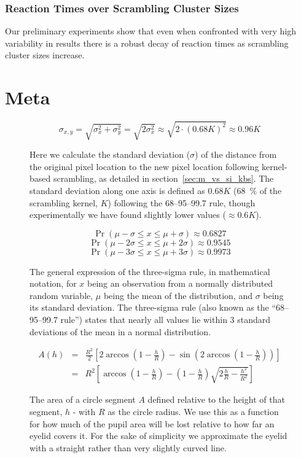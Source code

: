 	\subsection{Reaction Times over Scrambling Cluster Sizes}
	    Our preliminary experiments show that even when confronted with very high variability in results there is a robust decay of reaction times as scrambling cluster sizes increase. 
\chapter{Meta}
    \begin{figure}[H]
	\[ \sigma_{x,y} = \sqrt{\sigma_{x}^{2}+\sigma_{y}^{2}} = \sqrt{2\sigma_{x}^{2}} \approx \sqrt{2 \cdot (0.68 K)^{2}} \approx 0.96K\]
	\caption{Here we calculate the standard deviation ($\sigma$) of the distance from the original pixel location to the new pixel location following kernel-based scrambling, as detailed in section~\ref{sec:m_vs_si_kbs}. The standard deviation along one axis is defined as $0.68K$ (\SI{68}{\percent} of the scrambling kernel, $K$) following the 68–95–99.7 rule, though experimentally we have found slightly lower values ($\approx 0.6K$).}
	\label{eq:lrgn}
    \end{figure}
    \begin{figure}[H]
	\[\Pr(\mu - \sigma \le x \le \mu + \sigma) \approx 0.6827 \]
	\[\Pr(\mu - 2\sigma \le x \le \mu + 2\sigma) \approx 0.9545 \]
	\[\Pr(\mu - 3\sigma \le x \le \mu + 3\sigma) \approx 0.9973 \]
	\caption{The general expression of the three-sigma rule, in mathematical notation, for $x$ being an observation from a normally distributed random variable, $\mu$ being the mean of the distribution, and $\sigma$ being its standard deviation. The three-sigma rule (also known as the “68–95–99.7 rule”) states that nearly all values lie within 3 standard deviations of the mean in a normal distribution.}
	\label{eq:3s}
    \end{figure}
    \begin{figure}[H]
	\begin{eqnarray*}
	    A(h)&=&\frac{R^2}{2}\left[2\arccos\left(1-\frac{h}{R}\right) - \sin\left(2 \arccos\left(1-\frac{h}{R}\right)\right) \right]\\
	    &=&R^2 \left [\arccos{\left (1-\frac{h}{R}\right)} - \left (1-\frac{h}{R}\right) \sqrt{2 \frac{h}{R} - \frac{h^2}{R^2}} \right]
	\end{eqnarray*}
	\caption{The area of a circle segment $A$ defined relative to the height of that segment, $h$ - with $R$ as the circle radius. We use this as a function for how much of the pupil area will be lost relative to how far an eyelid covers it. For the sake of simplicity we approximate the eyelid with a straight rather than very slightly curved line.}
	\label{eq:cs}
    \end{figure}
